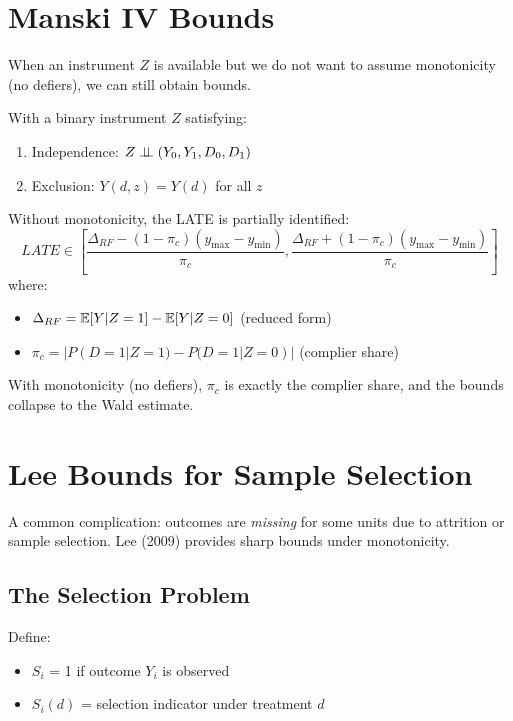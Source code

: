 \section{Manski IV Bounds}
\label{sec:manski_iv}

When an instrument $Z$ is available but we do not want to assume monotonicity (no defiers), we can still obtain bounds.

\begin{theorem}[IV Bounds]
\label{thm:iv_bounds}
With a binary instrument $Z$ satisfying:
\begin{enumerate}
    \item Independence: $Z \perp\!\!\!\perp (Y_0, Y_1, D_0, D_1)$
    \item Exclusion: $Y(d, z) = Y(d)$ for all $z$
\end{enumerate}

Without monotonicity, the LATE is partially identified:
\[
LATE \in \left[\frac{\Delta_{RF} - (1 - \pi_c)(y_{\max} - y_{\min})}{\pi_c}, \frac{\Delta_{RF} + (1 - \pi_c)(y_{\max} - y_{\min})}{\pi_c}\right]
\]
where:
\begin{itemize}
    \item $\Delta_{RF} = \mathbb{E}[Y|Z=1] - \mathbb{E}[Y|Z=0]$ (reduced form)
    \item $\pi_c = |P(D=1|Z=1) - P(D=1|Z=0)|$ (complier share)
\end{itemize}
\end{theorem}

With monotonicity (no defiers), $\pi_c$ is exactly the complier share, and the bounds collapse to the Wald estimate.


\section{Lee Bounds for Sample Selection}
\label{sec:lee_bounds}

A common complication: outcomes are \emph{missing} for some units due to attrition or sample selection. Lee (2009) provides sharp bounds under monotonicity.

\subsection{The Selection Problem}

Define:
\begin{itemize}
    \item $S_i$ = 1 if outcome $Y_i$ is observed
    \item $S_i(d)$ = selection indicator under treatment $d$
\end{itemize}

